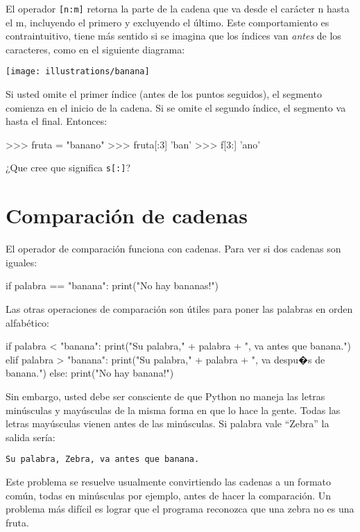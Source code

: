 El operador \texttt{{[}n:m{]}} retorna la parte de la cadena que va
desde el carácter n hasta el m, incluyendo el primero y excluyendo
el último. Este comportamiento es contraintuitivo, tiene más sentido
si se imagina que los índices van {\em antes} de los caracteres,
como en el siguiente diagrama:

\beforefig \centerline{\texttt{[image: illustrations/banana]}}
\afterfig

Si usted omite el primer índice (antes de los puntos seguidos), el
segmento comienza en el inicio de la cadena. Si se omite el segundo
índice, el segmento va hasta el final. Entonces:
\begin{pyconcode}
>>> fruta  = "banano"
>>> fruta[:3]
'ban'
>>> f[3:]
'ano'
\end{pyconcode}
 ¿Que cree que significa \texttt{s{[}:{]}}?

\section{Comparación de cadenas}

 

El operador de comparación funciona con cadenas. Para ver si dos cadenas
son iguales:
\begin{pythoncode}
if palabra == "banana":
  print("No hay bananas!")
\end{pythoncode}
Las otras operaciones de comparación son útiles para poner las palabras
en orden alfabético:
\begin{pythoncode}
if palabra < "banana":
  print("Su palabra," + palabra + ", va antes que banana.")
elif palabra > "banana":
  print("Su palabra," + palabra + ", va despu�s de banana.")
else:
  print("No hay banana!")
\end{pythoncode}

Sin embargo, usted debe ser consciente de que Python no maneja las
letras minúsculas y mayúsculas de la misma forma en que lo hace la
gente. Todas las letras mayúsculas vienen antes de las minúsculas.
Si palabra vale ``Zebra'' la salida sería:
\begin{verbatim}
Su palabra, Zebra, va antes que banana.
\end{verbatim}
Este problema se resuelve usualmente convirtiendo las cadenas a un
formato común, todas en minúsculas por ejemplo, antes de hacer la
comparación. Un problema más difícil es lograr que el programa reconozca
que una zebra no es una fruta.

